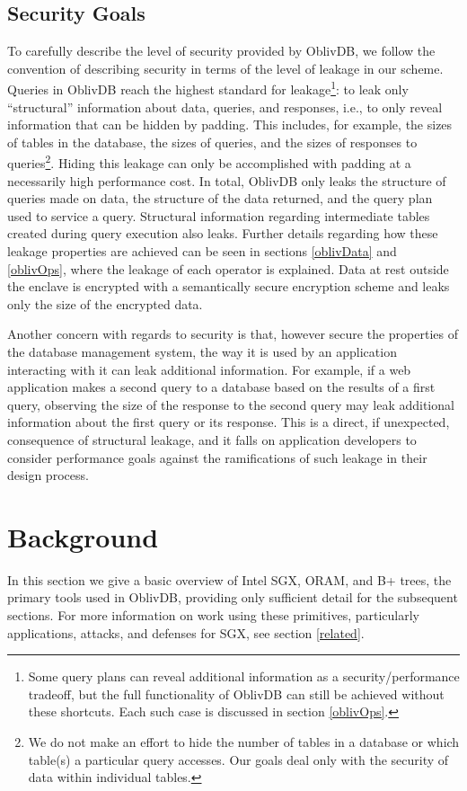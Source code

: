 \documentclass[USenglish,oneside,twocolumn]{article}
\def\name/{OblivDB}
\begin{document}
\subsection{Security Goals}
To carefully describe the level of security provided by \name/, we follow the convention \cite{FVY+17} of describing security in terms of the level of leakage in our scheme. Queries in \name/ reach the highest standard for leakage\footnote{Some query plans can reveal additional information as a security/performance tradeoff, but the full functionality of \name/ can still be achieved without these shortcuts. Each such case is discussed in section \ref{oblivOps}.}: to leak only ``structural'' information about data, queries, and responses, i.e., to only reveal information that can be hidden by padding. This includes, for example, the sizes of tables in the database, the sizes of queries, and the sizes of responses to queries\footnote{We do not make an effort to hide the number of tables in a database or which table(s) a particular query accesses. Our goals deal only with the security of data within individual tables.}. Hiding this leakage can only be accomplished with padding at a necessarily high performance cost. In total, \name/ only leaks the structure of queries made on data, the structure of the data returned, and the query plan used to service a query. Structural information regarding intermediate tables created during query execution also leaks. Further details regarding how these leakage properties are achieved can be seen in sections \ref{oblivData} and \ref{oblivOps}, where the leakage of each operator is explained. Data at rest outside the enclave is encrypted with a semantically secure encryption scheme and leaks only the size of the encrypted data. 

Another concern with regards to security is that, however secure the properties of the database management system, the way it is used by an application interacting with it can leak additional information. For example, if a web application makes a second query to a database based on the results of a first query, observing the size of the response to the second query may leak additional information about the first query or its response. This is a direct, if unexpected, consequence of structural leakage, and it falls on application developers to consider performance goals against the ramifications of such leakage in their design process. 

\section{Background}\label{background}
In this section we give a basic overview of Intel SGX, ORAM, and B+ trees, the primary tools used in \name/, providing only sufficient detail for the subsequent sections. For more information on work using these primitives, particularly applications, attacks, and defenses for SGX, see section \ref{related}.
\end{document}
